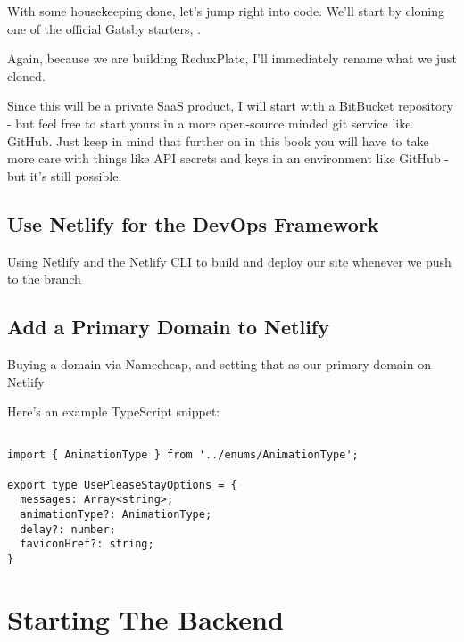 \documentclass[a4paper,
                             oneside,
                             BCOR1.0cm,
                             DIV11,
                             parskip=full,
                             11pt]{scrbook}
\begin{document}
With some housekeeping done, let's jump right into code. We'll start by cloning one of the official Gatsby starters, .

Again, because we are building ReduxPlate, I'll immediately rename what we just cloned.

Since this will be a private SaaS product, I will start with a BitBucket repository - but feel free to start yours in a more open-source minded git service like GitHub. Just keep in mind that further on in this book you will have to take more care with things like API secrets and keys in an environment like GitHub - but it's still possible.


\section{Use Netlify for the DevOps Framework}\label{sec:titles}
\begin{arrows}
\item Using Netlify and the Netlify CLI to build and deploy our site whenever we push to the  branch
\end{arrows}

\section{Add a Primary Domain to Netlify}\label{sec:titles}
\begin{arrows}
\item Buying a domain via Namecheap, and setting that as our primary domain on Netlify
\end{arrows}





Here's an example TypeScript snippet:

\begin{verbatim}

import { AnimationType } from '../enums/AnimationType';

export type UsePleaseStayOptions = {
  messages: Array<string>;
  animationType?: AnimationType;
  delay?: number;
  faviconHref?: string;
}

\end{verbatim}

\chapter{Starting The Backend}\label{cap:primer}
\end{document}
